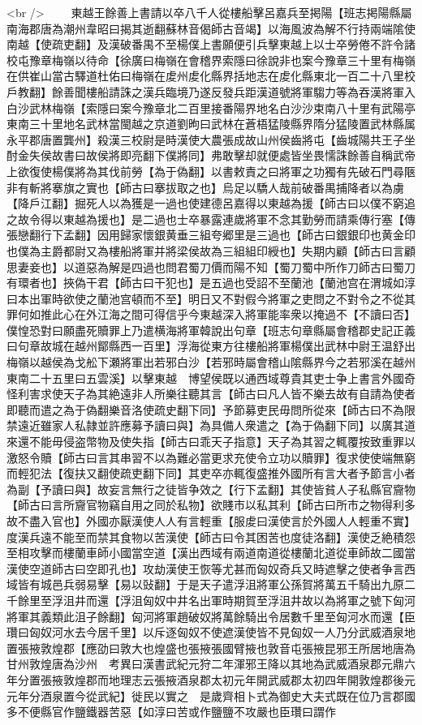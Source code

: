 <br />
　　東越王餘善上書請以卒八千人從樓船擊呂嘉兵至掲陽【班志掲陽縣屬南海郡唐為潮州韋昭曰揭其逝翻蘇林音偈師古音竭】以海風波為解不行持兩端隂使南越【使疏吏翻】及漢破番禺不至楊僕上書願便引兵擊東越上以士卒勞倦不許令諸校屯豫章梅嶺以待命【徐廣曰梅嶺在會稽界索隱曰徐說非也案今豫章三十里有梅嶺在供崔山當古驛道杜佑曰梅嶺在䖍州䖍化縣界括地志在䖍化縣東北一百二十八里校戶教翻】餘善聞樓船請誅之漢兵臨境乃遂反發兵距漢道號將軍騶力等為吞漢將軍入白沙武林梅嶺【索隱曰案今豫章北二百里接番陽界地名白沙沙束南八十里有武陽亭東南三十里地名武林當閩越之京道劉昫曰武林在蒼梧猛陵縣界隋分猛陵置武林縣属永平郡唐置龔州】殺漢三校尉是時漢使大農張成故山州侯齒將屯【齒城陽共王子坐酎金失侯故書曰故侯將即亮翻下僕將同】弗敢擊却就便處皆坐畏懦誅餘善自稱武帝上欲復使楊僕將為其伐前勞【為于偽翻】以書敕責之曰將軍之功獨有先破石門尋陿非有斬將搴旗之實也【師古曰搴拔取之也】烏足以驕人哉前破番禺捕降者以為虜【降戶江翻】掘死人以為獲是一過也使建德呂嘉得以東越為援【師古曰以僕不窮追之故令得以東越為援也】是二過也士卒暴露連歲將軍不念其勤勞而請乘傳行塞【傳張戀翻行下孟翻】因用歸家懷銀黄垂三組夸郷里是三過也【師古曰銀銀印也黄金印也僕為主爵都尉又為樓船將軍并將梁侯故為三組組印綬也】失期内顧【師古曰言顧思妻妾也】以道惡為解是四過也問君蜀刀價而陽不知【蜀刀蜀中所作刀師古曰蜀刀有環者也】挾偽干君【師古曰干犯也】是五過也受詔不至蘭池【蘭池宫在渭城如淳曰本出軍時欲使之蘭池宫頓而不至】明日又不對假今將軍之吏問之不對令之不從其罪何如推此心在外江海之間可得信乎今東越深入將軍能率衆以掩過不【不讀曰否】僕惶恐對曰願盡死贖罪上乃遣横海將軍韓說出句章【班志句章縣屬會稽郡史記正義曰句章故城在越州鄮縣西一百里】浮海從東方往樓船將軍楊僕出武林中尉王温舒出梅嶺以越侯為戈舩下瀬將軍出若邪白沙【若邪時屬會稽山隂縣界今之若邪溪在越州東南二十五里曰五雲溪】以擊東越　博望侯既以通西域尊貴其吏士争上書言外國奇怪利害求使天子為其絶遠非人所樂往聽其言【師古曰凡人皆不樂去故有自請為使者即聽而遣之為于偽翻樂音洛使疏史翻下同】予節募吏民毋問所從來【師古曰不為限禁遠近雖家人私隷並許應募予讀曰與】為具備人衆遣之【為于偽翻下同】以廣其道來還不能毋侵盗幣物及使失指【師古曰乖天子指意】天子為其習之輒覆按致重罪以激怒令贖【師古曰言其串習不以為難必當更求充使令立功以贖罪】復求使使端無窮而輕犯法【復扶又翻使疏吏翻下同】其吏卒亦輒復盛推外國所有言大者予節言小者為副【予讀曰與】故妄言無行之徒皆争效之【行下孟翻】其使皆貧人子私縣官齎物【師古曰言所齎官物竊自用之同於私物】欲賤市以私其利【師古曰所市之物得利多故不盡入官也】外國亦厭漢使人人有言輕重【服䖍曰漢使言於外國人人輕重不實】度漢兵遠不能至而禁其食物以苦漢使【師古曰令其困苦也度徒洛翻】漢使乏絶積怨至相攻擊而樓蘭車師小國當空道【漢出西域有兩道南道從樓蘭北道從車師故二國當漢使空道師古曰空即孔也】攻劫漢使王恢等尤甚而匈奴奇兵又時遮擊之使者争言西域皆有城邑兵弱易擊【易以䜴翻】于是天子遣浮沮將軍公孫賀將萬五千騎出九原二千餘里至浮沮井而還【浮沮匈奴中井名出軍時期賀至浮沮井故以為將軍之號下匈河將軍其義類此沮子餘翻】匈河將軍趙破奴將萬餘騎出令居數千里至匈河水而還【臣瓚曰匈奴河水去今居千里】以斥逐匈奴不使遮漢使皆不見匈奴一人乃分武威酒泉地置張掖敦煌郡【應劭曰敦大也煌盛也張掖張國臂掖也敦音屯張掖昆邪王所居地唐為甘州敦煌唐為沙州　考異曰漢書武紀元狩二年渾邪王降以其地為武威酒泉郡元鼎六年分置張掖敦煌郡而地理志云張掖酒泉郡太初元年開武威郡太初四年開敦煌郡後元元年分酒泉置今從武紀】徙民以實之　是歲齊相卜式為御史大夫式既在位乃言郡國多不便縣官作鹽鐵器苦惡【如淳曰苦或作鹽鹽不攻嚴也臣瓚曰謂作